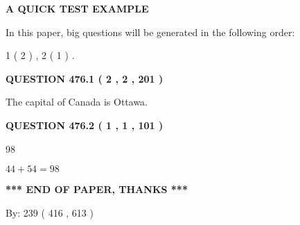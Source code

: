 \documentclass[12pt]{article}
\begin{document}
   
   
   
   
   
 \vspace{0.2in}
{\LARGE {\textbf{ A QUICK TEST EXAMPLE}}}
   
   
   
\vspace{0.2in}
   
In this paper, big questions will be generated in the following order: 
   
   
   1 ( 2 )
 ,
   2 ( 1 )
 .
  
\vspace{0.2in}
  
{\textbf{\Large{QUESTION
476.1 
 ( 2 , 2 , 201 )
}}}
  
  
 
 
\noindent{}
 
 
The capital of Canada is Ottawa.
 
 
 
 
  
\vspace{0.2in}
  
{\textbf{\Large{QUESTION
476.2 
 ( 1 , 1 , 101 )
}}}
  
  
 
 
\noindent{}

98
 
 
 
 
\noindent{}

$ %
44 +  %
54=   %
98$
 
 
   
   
 \vspace{0.2in}
 
   
   
   
   
\vspace{1.0in} 
{\textbf{\large{ *** END OF PAPER, THANKS *** }}} 
   
   
\hspace{1.0in} By: 
 239 ( 416 ,  613 )
   
   
   
   
\newpage 
\setcounter{page}{ 
   477001 } 
   
   
   
\end{document}
